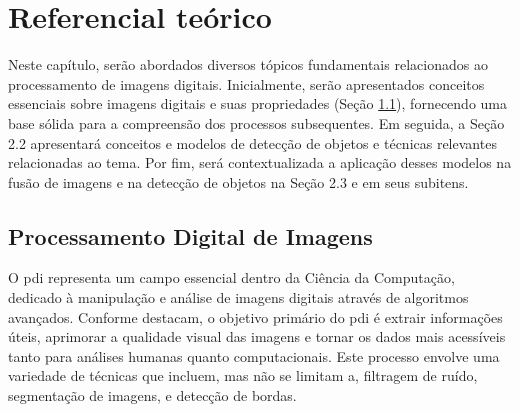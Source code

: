 \chapter{Referencial te\'orico}\label{cap:referencialTeorico}

Neste capítulo, serão abordados diversos tópicos fundamentais relacionados ao processamento de imagens digitais. Inicialmente, serão apresentados conceitos essenciais sobre imagens digitais e suas propriedades (Seção \ref{sec:fusao21}), fornecendo uma base sólida para a compreensão dos processos subsequentes. %
Em seguida, a Seção 2.2 apresentará conceitos e modelos de detecção de objetos e técnicas relevantes relacionadas ao tema. Por fim, será contextualizada a aplicação desses modelos na fusão de imagens e na detecção de objetos na Seção 2.3 e em seus subitens.


\section{Processamento Digital de Imagens}\label{sec:fusao21}



O \gls{pdi} representa um campo essencial dentro da Ciência da Computação, dedicado à manipulação e análise de imagens digitais através de algoritmos avançados. Conforme  destacam, o objetivo primário do \gls{pdi} é extrair informações úteis, aprimorar a qualidade visual das imagens e tornar os dados mais acessíveis tanto para análises humanas quanto computacionais. Este processo envolve uma variedade de técnicas que incluem, mas não se limitam a, filtragem de ruído, segmentação de imagens, e detecção de bordas.

